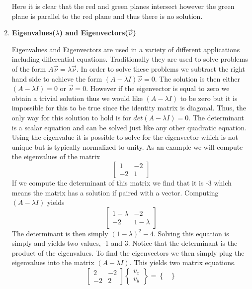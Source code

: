 \begin{enumerate}
\begin{figure}[htb]
\begin{center}
  \end{center}
\end{figure}
Here it is clear that the red and green planes intersect however the
green plane is parallel to the red plane and thus there is no
solution. 

\item {\bf Eigenvalues($\lambda$) and Eigenvectors($\vec{\nu}$)}

Eigenvalues and Eigenvectors are used in a variety of different
applications including differential equations. Traditionally they are
used to solve problems of the form $A\vec{\nu}=\lambda\vec{\nu}$. In
order to solve these problems we subtract the right hand side to
achieve the form $(A-\lambda I)\vec{\nu}=0$. The solution is then
either $(A-\lambda I) = 0$ or $\vec{\nu} = 0$. However if the
eigenvector is equal to zero we obtain a trivial solution thus we
would like $(A-\lambda I)$ to be zero but it is impossible for this to
be true since the identity matrix is diagonal. Thus, the only way for
this solution to hold is for $det(A-\lambda I)=0$. The determinant is
a scalar equation and can be solved just like any other quadratic
equation. Using the eigenvalue it is possible to solve for the
eigenvector which is not unique but is typically normalized to
unity. As an example we will compute the eigenvalues of the matrix 
\begin{equation}
\begin{bmatrix}
1 & -2  \\
-2 & 1
\end{bmatrix}
\end{equation}
If we compute the determinant of this matrix we find that it is -3
which means the matrix has a solution if paired with a
vector. Computing $(A-\lambda I)$ yields
\begin{equation}
\begin{bmatrix}
1-\lambda & -2  \\
-2 & 1-\lambda
\end{bmatrix}
\end{equation}
The determinant is then simply $(1-\lambda)^2-4$. Solving this
equation is simply and yields two values, -1 and 3. Notice that the
determinant is the product of the eigenvalues. To find the
eigenvectors we then simply plug the eigenvalues into the matrix
$(A-\lambda I)$. This yields two matrix equations. 
\begin{equation}
\begin{bmatrix}
2 & -2  \\
-2 & 2
\end{bmatrix}\begin{Bmatrix}v_x \\ v_y\end{Bmatrix} = \begin{Bmatrix}

\end{Bmatrix}
\end{equation}
\end{enumerate}
